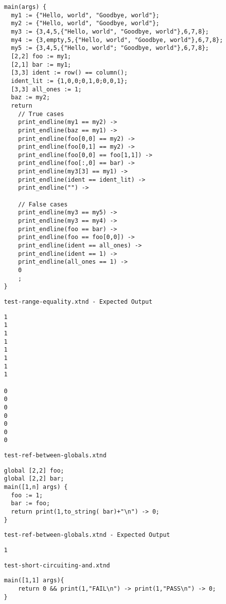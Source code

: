 \begin{lstlisting}
main(args) {
  my1 := {"Hello, world", "Goodbye, world"};
  my2 := {"Hello, world", "Goodbye, world"};
  my3 := {3,4,5,{"Hello, world", "Goodbye, world"},6,7,8};
  my4 := {3,empty,5,{"Hello, world", "Goodbye, world"},6,7,8};
  my5 := {3,4,5,{"Hello, world"; "Goodbye, world"},6,7,8};
  [2,2] foo := my1;
  [2,1] bar := my1;
  [3,3] ident := row() == column();
  ident_lit := {1,0,0;0,1,0;0,0,1};
  [3,3] all_ones := 1;
  baz := my2;
  return
    // True cases
    print_endline(my1 == my2) ->
    print_endline(baz == my1) ->
    print_endline(foo[0,0] == my2) ->
    print_endline(foo[0,1] == my2) ->
    print_endline(foo[0,0] == foo[1,1]) ->
    print_endline(foo[:,0] == bar) ->
    print_endline(my3[3] == my1) ->
    print_endline(ident == ident_lit) ->
    print_endline("") ->

    // False cases
    print_endline(my3 == my5) ->
    print_endline(my3 == my4) ->
    print_endline(foo == bar) ->
    print_endline(foo == foo[0,0]) ->
    print_endline(ident == all_ones) ->
    print_endline(ident == 1) ->
    print_endline(all_ones == 1) ->
    0
    ;
}
\end{lstlisting}


\medskip \noindent \texttt{test-range-equality.xtnd - Expected Output}


\begin{lstlisting}
1
1
1
1
1
1
1
1

0
0
0
0
0
0
0
\end{lstlisting}


\medskip \noindent \texttt{test-ref-between-globals.xtnd}


\begin{lstlisting}
global [2,2] foo;
global [2,2] bar;
main([1,n] args) {
  foo := 1;
  bar := foo;
  return print(1,to_string( bar)+"\n") -> 0;
}
\end{lstlisting}


\medskip \noindent \texttt{test-ref-between-globals.xtnd - Expected Output}


\begin{lstlisting}
1
\end{lstlisting}


\medskip \noindent \texttt{test-short-circuiting-and.xtnd}


\begin{lstlisting}
main([1,1] args){
	return 0 && print(1,"FAIL\n") -> print(1,"PASS\n") -> 0;
}
\end{lstlisting}


